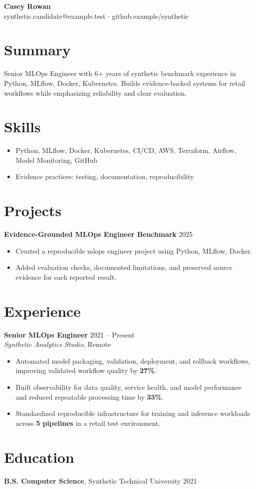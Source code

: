 \documentclass[10pt,letterpaper]{article}
\begin{document}
\begin{center}
{\Large \textbf{Casey Rowan}}\\
synthetic.candidate@example.test $\cdot$ github.example/synthetic
\end{center}

\section*{Summary}
Senior MLOps Engineer with 6+ years of synthetic benchmark experience in Python, MLflow, Docker, Kubernetes. Builds evidence-backed systems for retail workflows while emphasizing reliability and clear evaluation.

\section*{Skills}
\begin{itemize}
  \item Python, MLflow, Docker, Kubernetes, CI/CD, AWS, Terraform, Airflow, Model Monitoring, GitHub
  \item Evidence practices: testing, documentation, reproducibility
\end{itemize}

\section*{Projects}
\textbf{Evidence-Grounded MLOps Engineer Benchmark} \hfill 2025
\begin{itemize}
  \item Created a reproducible mlops engineer project using Python, MLflow, Docker.
  \item Added evaluation checks, documented limitations, and preserved source evidence for each reported result.
\end{itemize}

\section*{Experience}
\textbf{Senior MLOps Engineer} \hfill 2021 -- Present\\
\textit{Synthetic Analytics Studio}, Remote
\begin{itemize}
  \item Automated model packaging, validation, deployment, and rollback workflows, improving validated workflow quality by \textbf{27\%}.
  \item Built observability for data quality, service health, and model performance and reduced repeatable processing time by \textbf{33\%}.
  \item Standardized reproducible infrastructure for training and inference workloads across \textbf{5 pipelines} in a retail test environment.
\end{itemize}

\section*{Education}
\textbf{B.S. Computer Science}, Synthetic Technical University \hfill 2021
\end{document}
